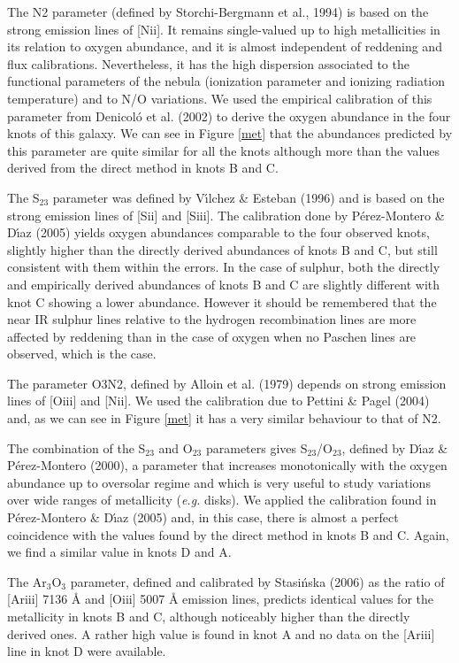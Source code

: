 \documentclass[structabstract]{aa}
\begin{document}
The N2 parameter (defined by Storchi-Bergmann et al., 1994) is based on the strong emission lines of [N{\sc ii}]. It remains single-valued up to high metallicities in its relation to oxygen abundance, and it is almost independent of reddening and flux calibrations. Nevertheless, it has the high dispersion associated to the functional parameters of the nebula (ionization parameter and ionizing radiation temperature) and to N/O variations. We used the empirical calibration of this parameter from Denicol\'o et al. (2002) to derive the oxygen abundance in the four knots of this galaxy. We can see in Figure \ref{met} that the abundances predicted by this parameter are quite similar for all the knots although more than the values derived from the direct method in knots B and C.

The S$_{23}$ parameter was defined by V\'\i lchez \& Esteban (1996) and is based on the strong
emission lines of [S{\sc ii}] and [S{\sc iii}]. The calibration done by P\'erez-Montero \& D\'\i az (2005) yields oxygen abundances comparable to the four observed knots, slightly higher than the directly derived abundances of knots B and C, but still consistent with them within the errors.  In the case of sulphur, both the directly and empirically derived abundances of knots B and C are slightly different with knot C showing a lower abundance. However it should be remembered that the near IR sulphur lines relative to the hydrogen recombination lines are more affected by reddening than in the case of oxygen when no Paschen lines are observed, which is the case. 

The parameter O3N2, defined by Alloin et al. (1979) depends on strong emission lines of [O{\sc iii}] and [N{\sc ii}]. We used the calibration due to Pettini \& Pagel (2004) and, as we can see in Figure \ref{met} it has a very similar behaviour to that of N2. 

The combination of the S$_{23}$ and O$_{23}$ parameters gives S$_{23}$/O$_{23}$, defined by D\'\i az \& P\'erez-Montero (2000), a parameter that increases monotonically with the oxygen abundance up to oversolar regime and which is very useful to study variations over wide ranges of metallicity ({\em e.g.} disks). We applied the calibration found in P\'erez-Montero \& D\'\i az (2005) and, in this case, there is almost a perfect coincidence with the values found by the direct method in knots B and C. Again, we find a similar value in knots D and A.

The Ar$_3$O$_3$ parameter, defined and calibrated by Stasi\'nska (2006) as the ratio of [Ar{\sc iii}] 7136 {\AA} and [O{\sc iii}] 5007 {\AA} emission lines, predicts identical values for the metallicity in knots B and C, although noticeably higher than the directly derived ones. A rather high value is found in knot A and no data on the [Ar{\sc iii}] line in knot D were available.
\end{document}

